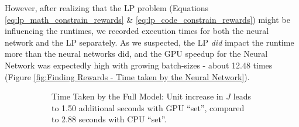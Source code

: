 \documentclass[12pt]{article}
\begin{document}
    However, after realizing that the LP problem (Equations \ref{eq:lp_math_constrain_rewards} \& \ref{eq:lp_code_constrain_rewards}) might be influencing the runtimes, we recorded execution times for both the neural network and the LP separately. As we suspected, the LP \textit{did} impact the runtime more than the neural networks did, and the GPU speedup for the Neural Network was expectedly high with growing batch-sizes - about 12.48 times (Figure \ref{fig:Finding Rewards - Time taken by the Neural Network}).
    \begin{figure}[!htbp]
        \centering
        \begin{subfigure}{\textwidth}
            \centering
            \caption{Time Taken by the Full Model: Unit increase in $J$ leads to 1.50 additional seconds with GPU ``set'', compared to 2.88 seconds with CPU ``set''.}
            \label{fig:Finding Rewards - Time Taken by the Full Model}
        \end{subfigure}\vspace*{1em}
        \begin{subfigure}{.49\textwidth}

\end{subfigure}
\end{figure}
\end{document}
